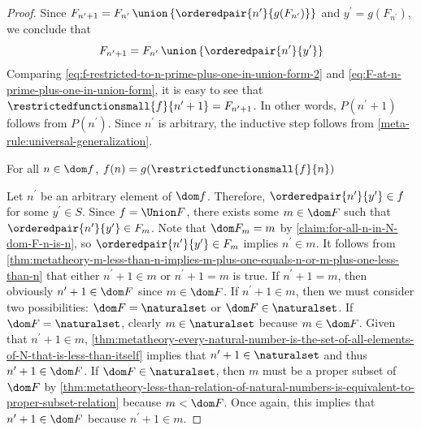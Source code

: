\begin{proof}
    Since \( F_{n^{\prime} + 1} = F_{n^{\prime}} \,{\union}\, \mleft\{ \orderedpair{n^{\prime}}{g(F_{n^{\prime}})} \mright\} \)
    and \( y^{\prime} = g(F_{n^{\prime}}) \), we conclude that
    \begin{equation}
        \label{eq:F-at-n-prime-plus-one-in-union-form}
        F_{n^{\prime} + 1} = F_{n^{\prime}} \,{\union}\, \mleft\{ \orderedpair{n^{\prime}}{y^{\prime}} \mright\}
    \end{equation}
    Comparing \eqref{eq:f-restricted-to-n-prime-plus-one-in-union-form-2} and \eqref{eq:F-at-n-prime-plus-one-in-union-form},
    it is easy to see that \( \restrictedfunctionsmall{f}{n^{\prime} + 1} = F_{n^{\prime} + 1} \).
    In other words, \( P(n^{\prime} + 1) \) follows from \( P(n^{\prime}) \).
    Since \( n^{\prime} \) is arbitrary, the inductive step follows from \cref{meta-rule:universal-generalization}.

    \begin{claim}
         \label{claim:the-value-of-f-at-n-is-the-value-of-g-at-f-restricted-to-n-for-all-n-in-dom-f}
        For all \( n \in \dom f \), \( f(n) = g( \restrictedfunctionsmall{f}{n} ) \)
    \end{claim}
    \noindent
    Let \( n^{\prime} \) be an arbitrary element of \( \dom f \).
    Therefore, \( \orderedpair{n^{\prime}}{y^{\prime}} \in f \) for some \( y^{\prime} \in S \).
    Since \( f = \Union F \), there exists some \( m \in \dom F \) such that \( \orderedpair{n^{\prime}}{y^{\prime}} \in F_{m} \).
    Note that \( \dom F_{m} = m \) by \cref{claim:for-all-n-in-N-dom-F-n-is-n}, so \( \orderedpair{n^{\prime}}{y^{\prime}} \in F_{m} \)
    implies \( n^{\prime} \in m \).
    It follows from \cref{thm:metatheory-m-less-than-n-implies-m-plus-one-equals-n-or-m-plus-one-less-than-n}
    that either \( n^{\prime} + 1 \in m \) or \( n^{\prime} + 1 = m \) is true.
    If \( n^{\prime} + 1 = m \), then obviously \( n^{\prime} + 1 \in \dom F \) since \( m \in \dom F \).
    If \( n^{\prime} + 1 \in m \), then we must consider two possibilities: \( \dom F = \naturalset \) or
    \( \dom F \in \naturalset \).
    If \( \dom F = \naturalset \), clearly \( m \in \naturalset \) because \( m \in \dom F \).
    Given that \( n^{\prime} + 1 \in m \), \cref{thm:metatheory-every-natural-number-is-the-set-of-all-elements-of-N-that-is-less-than-itself}
    implies that \( n^{\prime} + 1 \in \naturalset \) and thus \( n^{\prime} + 1 \in \dom F \).
    If \( \dom F \in \naturalset \), then \( m \) must be a proper subset of \( \dom F \)
    by \cref{thm:metatheory-less-than-relation-of-natural-numbers-is-equivalent-to-proper-subset-relation} because \( m < \dom F \).
    Once again, this implies that \( n^{\prime} + 1 \in \dom F \) because \( n^{\prime} + 1 \in m \).


\end{proof}
